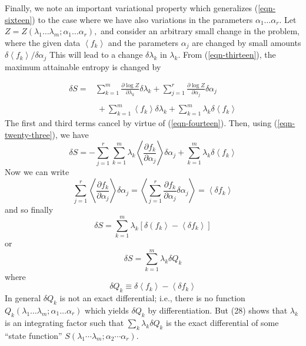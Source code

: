 \documentclass[]{article}
\begin{document}
Finally, we note an important variational property which generalizes
(\ref{eqn-sixteen}) to the case where we have also variations in the parameters
\(\alpha_{1}\ldots\alpha_{r}.\) Let
\(Z = Z\left( \lambda_{1}\ldots\lambda_{m};\alpha_{1}\ldots\alpha_{r} \right),\)
and consider an arbitrary small change in the problem, where the given
data \(\left\langle f_{k} \right\rangle\) and the parameters
\(\alpha_{j}\) are changed by small amounts
\(\delta\left\langle f_{k} \right\rangle/\delta\alpha_{j}\) This will
lead to a change \(\delta\lambda_{k}\) in \(\lambda_{k}\). From (\ref{eqn-thirteen}),
the maximum attainable entropy is changed by

\begin{align}
\delta S = & \sum_{k = 1}^{m}  \frac{\partial  \log Z}{\partial\lambda_{k}}\delta\lambda_{k} + \sum_{j = 1}^{r}  \frac{\partial  \log Z}{\partial\alpha_{j}}\delta\alpha_{j} \nonumber \\
\label{eqn-twenty-four} \\
 & \  + \sum_{k = 1}^{m}  \left\langle f_{k} \right\rangle\delta\lambda_{k} + \sum_{k = 1}^{m}  \lambda_{k}\delta\left\langle f_{k} \right\rangle \nonumber
\end{align}
The first and third terms cancel by virtue of (\ref{eqn-fourteen}). Then, using (\ref{eqn-twenty-three}), we
have
%
\begin{equation}
\delta S = - \sum_{j = 1}^{r} \sum_{k = 1}^{m} \lambda_{k}\left\langle \frac{\partial f_{k}}{\partial\alpha_{j}} \right\rangle\delta\alpha_{j} + \sum_{k = 1}^{m} \lambda_{k}\delta\left\langle f_{k} \right\rangle
\end{equation}
%
Now we can write
%
\begin{equation}
\sum_{j = 1}^{r} \left\langle \frac{\partial f_{k}}{\partial\alpha_{j}} \right\rangle\delta\alpha_{j} = \left\langle \sum_{j = 1}^{r}  \frac{\partial f_{k}}{\partial\alpha_{j}}\delta\alpha_{j} \right\rangle = \left\langle \delta f_{k} \right\rangle
\end{equation}
%
and so finally
%
\begin{equation}
\delta S = \sum_{k = 1}^{m} \lambda_{k}\left\lbrack \delta\left( f_{k} \right\rangle - \left\langle \delta f_{k} \right\rangle \right\rbrack
\end{equation}
%
or
%
\begin{equation}
\delta S = \sum_{k = 1}^{m} \lambda_{k}\delta Q_{k} \label{eqn-twenty-eight}
\end{equation}
%
where
%
\begin{equation}
\delta Q_{k} \equiv \delta\left\langle f_{k} \right\rangle - \left\langle \delta f_{k} \right\rangle \label{eqn-twenty-nine}
\end{equation}
In general \(\delta Q_{k}\) is not an exact differential; i.e., there is
no function
\(Q_{k}\left( \lambda_{1}\ldots\lambda_{m};\alpha_{1}\ldots\alpha_{r} \right)\)
which yields \(\delta Q_{k}\) by differentiation. But (28) shows that
\(\lambda_{k}\) is an integrating factor such that
\(\sum_{k} \lambda_{k}\delta Q_{k}\) is the exact
differential of some ``state function''
\(S\left( \lambda_{1}\cdots\lambda_{m};\alpha_{2}\cdots\alpha_{r} \right)\).
\end{document}
